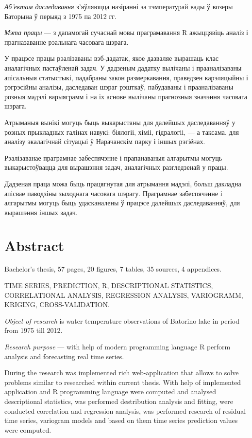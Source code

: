\textit{Аб'ектам даследавання} з'яўляюцца назіранні за тэмпературай вады ў возеры Баторына ў перыяд з 1975 па 2012 гг.

\textit{Мэта працы} --- з дапамогай сучаснай мовы праграмавання R ажыццявіць аналіз і прагназаванне рэальнага часовага шэрага.

У працэсе працы рэалізаваны вэб-дадатак, якое дазваляе вырашаць клас аналагічных пастаўленай задач. У дадзеным дадатку вылічаны і прааналізаваны апісальныя статыстыкі, падабраны закон размеркавання, праведзен карэляцыйны і рэгрэсійны аналізы, даследаван шэраг рэшткаў, пабудаваны і прааналізаваны розныя мадэлі варыяграмм і на іх аснове вылічаны прагнозныя значэння часовага шэрага.

Атрыманыя вынікі могуць быць выкарыстаны для далейшых даследаванняў у розных прыкладных галінах навукі: біялогіі, хіміі, гідралогіі, --- а таксама, для аналізу экалагічнай сітуацыі ў Нарачанскім парку і іншых рэгіёнах.

Рэалізаванае праграмнае забеспячэнне і прапанаваныя алгарытмы могуць выкарыстоўвацца для вырашэння задач, аналагічных разгледзенай у працы.

Дадзеная праца можа быць працягнутая для атрымання мадэлі, больш дакладна апісвае паводзіны зыходнага часовага шэрагу. Праграмнае забеспячэнне і алгарытмы могуць быць удасканалены ў працэсе далейшых даследаванняў, для вырашэння іншых задач.

\newpage

\chapter*{Abstract}
Bachelor's thesis, 57 pages, 20 figures, 7 tables, 35 sources, 4 appendices.

TIME SERIES, PREDICTION, R, DESCRIPTIONAL STATISTICS, CORRELATIONAL ANALYSIS, REGRESSION ANALYSIS, VARIOGRAMM, KRIGING, CROSS-VALIDATION.

\textit{Object of research} is water temperature observations of Batorino lake in period from 1975 till 2012.

\textit{Research purpose} --- with help of modern programming language R perform analysis and forecasting real time series.

During the research was implemented rich web-application that allows to solve problems similar to researched within current thesis. With help of implemented application and R programming language were computed and analysed descriptional statistics, was performed destribution analysis and fitting, were conducted correlation and regression analysis, was performed research of residual time series, variogram models and based on them time series prediction values were computed.

